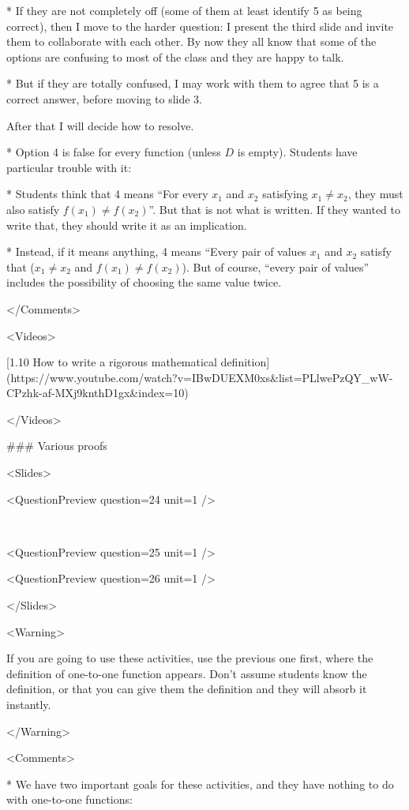     *   If they are not completely off (some of them at least identify 5 as being correct), then I move to the harder question: I present the third slide and invite them to collaborate with each other. By now they all know that some of the options are confusing to most of the class and they are happy to talk.

    *   But if they are totally confused, I may work with them to agree that 5 is a correct answer, before moving to slide 3.

    After that I will decide how to resolve.

*   Option 4 is false for every function (unless $D$ is empty). Students have particular trouble with it:

    *   Students think that 4 means “For every $x_{1}$ and $x_{2}$ satisfying $x_{1}\neq x_{2}$, they must also satisfy $f(x_{1}) \neq f(x_{2})$”. But that is not what is written. If they wanted to write that, they should write it as an implication.

    *   Instead, if it means anything, 4 means “Every pair of values $x_{1}$ and $x_{2}$ satisfy that ($x_{1}\neq x_{2}$ and $f(x_{1}) \neq f(x_{2})$). But of course, “every pair of values” includes the possibility of choosing the same value twice.

</Comments>

<Videos>

[1.10 How to write a rigorous mathematical definition](https://www.youtube.com/watch?v=IBwDUEXM0xs\&list=PLlwePzQY_wW-CPzhk-af-MXj9knthD1gx\&index=10)

</Videos>

### Various proofs

<Slides>

<QuestionPreview question={24} unit={1} />

 

<QuestionPreview question={25} unit={1} />

<QuestionPreview question={26} unit={1} />

</Slides>

<Warning>

If you are going to use these activities, use the previous one first, where the definition of one-to-one function appears. Don’t assume students know the definition, or that you can give them the definition and they will absorb it instantly.

</Warning>

<Comments>

*   We have two important goals for these activities, and they have nothing to do with one-to-one functions:

